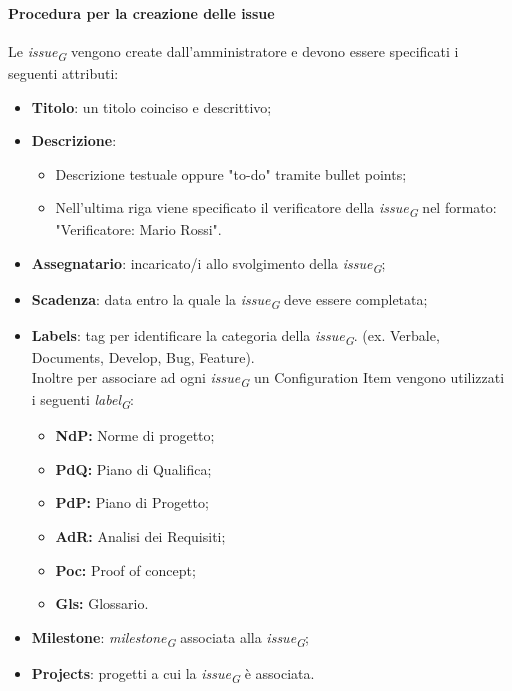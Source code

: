 \hypertarget{par:proceduraCreazioneIssue}{\paragraph*{Procedura per la creazione delle issue}}
Le \textit{issue}\textsubscript{\textit{G}} vengono create dall'amministratore e devono essere specificati i seguenti attributi:
\begin{itemize}
    \item \textbf{Titolo}: un titolo coinciso e descrittivo;
    \item \textbf{Descrizione}:
    \begin{itemize}
        \item Descrizione testuale oppure "to-do" tramite bullet points;
        \item Nell'ultima riga viene specificato il verificatore della \textit{issue}\textsubscript{\textit{G}} nel formato: "Verificatore: Mario Rossi".
    \end{itemize} 
    \item \textbf{Assegnatario}: incaricato/i allo svolgimento della \textit{issue}\textsubscript{\textit{G}};
    \item \textbf{Scadenza}: data entro la quale la \textit{issue}\textsubscript{\textit{G}} deve essere completata;
    \item \textbf{Labels}: tag per identificare la categoria della \textit{issue}\textsubscript{\textit{G}}. (ex. Verbale, Documents, Develop, Bug, Feature).\\
    Inoltre per associare ad ogni \textit{issue}\textsubscript{\textit{G}} un Configuration Item vengono utilizzati i seguenti \textit{label}\textsubscript{\textit{G}}:
    \begin{itemize}
        \item \textbf{NdP:} Norme di progetto;
        \item \textbf{PdQ:} Piano di Qualifica;
        \item \textbf{PdP:} Piano di Progetto;
        \item \textbf{AdR:} Analisi dei Requisiti;
        \item \textbf{Poc:} Proof of concept;
        \item \textbf{Gls:} Glossario.
    \end{itemize}
    \item \textbf{Milestone}: \textit{milestone}\textsubscript{\textit{G}} associata alla \textit{issue}\textsubscript{\textit{G}};
    \item \textbf{Projects}: progetti a cui la \textit{issue}\textsubscript{\textit{G}} è associata. \\

\end{itemize}
